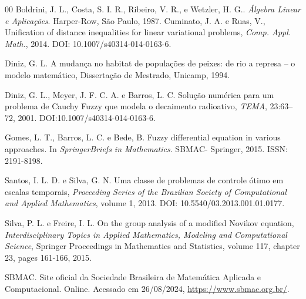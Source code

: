\documentclass[a4paper, 11pt]{article}
\begin{document}
	\begin{thebibliography}{00} \footnotesize
		Boldrini, J. L., Costa, S. I. R., Ribeiro, V. R., e Wetzler, H. G.. {\it Álgebra Linear e Aplicações}. Harper-Row, São Paulo, 1987.
		Cuminato, J. A. e Ruas, V., Unification of distance inequalities for linear variational problems, {\it Comp. Appl. Math.}, 2014. DOI: 10.1007/s40314-014-0163-6.

Diniz, G. L. A mudança no habitat de populações de peixes: de rio a represa -- o modelo 
matemático, Dissertação de Mestrado, Unicamp, 1994.

Diniz, G. L., Meyer, J. F. C. A. e Barros, L. C. Solução numérica para um problema de 
Cauchy Fuzzy que modela o decaimento radioativo, {\it TEMA},  23:63--72, 2001. DOI:10.1007/s40314-014-0163-6.

Gomes, L. T., Barros, L. C. e Bede, B. Fuzzy differential equation in various approaches. 
In {\it SpringerBriefs in Mathematics}. SBMAC- Springer, 2015. ISSN: 2191-8198.

 Santos, I. L. D. e Silva, G. N. Uma classe de problemas de controle ótimo 
em escalas temporais, {\it Proceeding Series of the Brazilian Society of Computational and 
Applied Mathematics}, volume 1, 2013. DOI: 10.5540/03.2013.001.01.0177.

	 Silva, P. L. e Freire, I. L. On the group analysis of a modified Novikov equation, 
{\it Interdisciplinary Topics in Applied Mathematics, Modeling and Computational Science}, 
Springer Proceedings in Mathematics and Statistics,  volume 117, chapter 23, pages 161-166, 2015.

	 SBMAC. Site oficial da Sociedade Brasileira de Matemática Aplicada e Computacional. Online. Acessado em 26/08/2024, \url{https://www.sbmac.org.br/}.

	\end{thebibliography}
\end{document}
